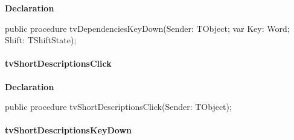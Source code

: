 \documentclass{report}
\newif\ifpdf
\begin{document}
\label{prjwizard.TfrmProjectWizard-tvDependenciesKeyDown}
\begin{list}{}{
\setlength{\itemindent}{0cm}
\setlength{\listparindent}{0cm}
\setlength{\leftmargin}{\evensidemargin}
\addtolength{\leftmargin}{\tmplength}
\settowidth{\labelsep}{X}
\addtolength{\leftmargin}{\labelsep}
\setlength{\labelwidth}{\tmplength}
}
\item[\textbf{Declaration}\hfill]
\ifpdf
\begin{flushleft}
\fi
\begin{ttfamily}
public procedure tvDependenciesKeyDown(Sender: TObject; var Key: Word; Shift: TShiftState);\end{ttfamily}

\ifpdf
\end{flushleft}
\fi

\end{list}
\paragraph*{tvShortDescriptionsClick}\hspace*{\fill}

\label{prjwizard.TfrmProjectWizard-tvShortDescriptionsClick}
\begin{list}{}{
\setlength{\itemindent}{0cm}
\setlength{\listparindent}{0cm}
\setlength{\leftmargin}{\evensidemargin}
\addtolength{\leftmargin}{\tmplength}
\settowidth{\labelsep}{X}
\addtolength{\leftmargin}{\labelsep}
\setlength{\labelwidth}{\tmplength}
}
\item[\textbf{Declaration}\hfill]
\ifpdf
\begin{flushleft}
\fi
\begin{ttfamily}
public procedure tvShortDescriptionsClick(Sender: TObject);\end{ttfamily}

\ifpdf
\end{flushleft}
\fi

\end{list}
\paragraph*{tvShortDescriptionsKeyDown}\hspace*{\fill}
\end{document}

